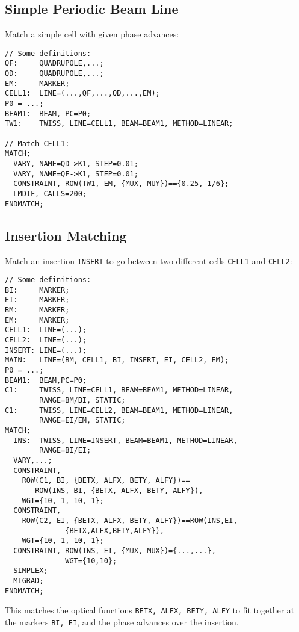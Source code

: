 \subsection{Simple Periodic Beam Line}
Match a simple cell with given phase advances:
\begin{verbatim}
// Some definitions:
QF:     QUADRUPOLE,...;
QD:     QUADRUPOLE,...;
EM:     MARKER;
CELL1:  LINE=(...,QF,...,QD,...,EM);
P0 = ...;
BEAM1:  BEAM, PC=P0;
TW1:    TWISS, LINE=CELL1, BEAM=BEAM1, METHOD=LINEAR;

// Match CELL1:
MATCH;
  VARY, NAME=QD->K1, STEP=0.01;
  VARY, NAME=QF->K1, STEP=0.01;
  CONSTRAINT, ROW(TW1, EM, {MUX, MUY})=={0.25, 1/6};
  LMDIF, CALLS=200;
ENDMATCH;
\end{verbatim}

\subsection{Insertion Matching}
Match an insertion \texttt{INSERT} to go between
two different cells \texttt{CELL1} and \texttt{CELL2}:
\begin{verbatim}
// Some definitions:
BI:     MARKER;
EI:     MARKER;
BM:     MARKER;
EM:     MARKER;
CELL1:  LINE=(...);
CELL2:  LINE=(...);
INSERT: LINE=(...);
MAIN:   LINE=(BM, CELL1, BI, INSERT, EI, CELL2, EM);
P0 = ...;
BEAM1:  BEAM,PC=P0;
C1:     TWISS, LINE=CELL1, BEAM=BEAM1, METHOD=LINEAR,
		RANGE=BM/BI, STATIC;
C1:     TWISS, LINE=CELL2, BEAM=BEAM1, METHOD=LINEAR,
        RANGE=EI/EM, STATIC;
MATCH;
  INS:  TWISS, LINE=INSERT, BEAM=BEAM1, METHOD=LINEAR,
        RANGE=BI/EI;
  VARY,...;
  CONSTRAINT,
    ROW(C1, BI, {BETX, ALFX, BETY, ALFY})==
       ROW(INS, BI, {BETX, ALFX, BETY, ALFY}),
    WGT={10, 1, 10, 1};
  CONSTRAINT,
    ROW(C2, EI, {BETX, ALFX, BETY, ALFY})==ROW(INS,EI,
              {BETX,ALFX,BETY,ALFY}),
    WGT={10, 1, 10, 1};
  CONSTRAINT, ROW(INS, EI, {MUX, MUX})={...,...},
              WGT={10,10};
  SIMPLEX; 
  MIGRAD;
ENDMATCH;
\end{verbatim}
This matches the optical functions \texttt{BETX, ALFX, BETY, ALFY} to fit
together at the markers \texttt{BI, EI}, and the phase advances over
the insertion.


